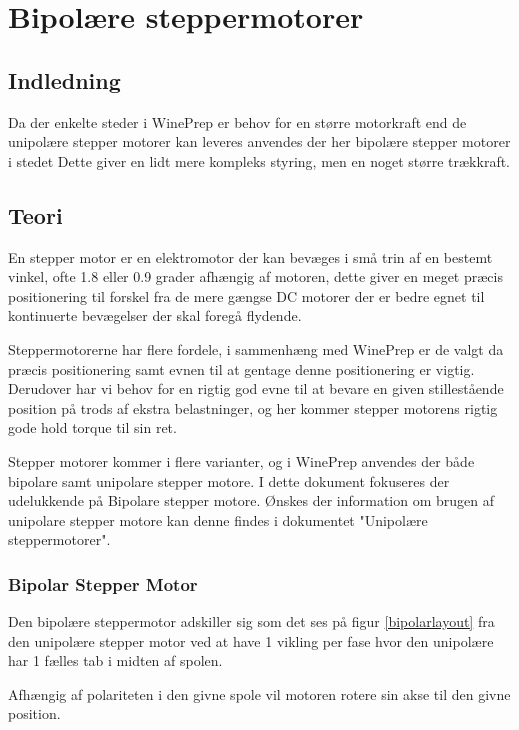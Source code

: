 \chapter{Bipolære steppermotorer}

\section{Indledning}
Da der enkelte steder i WinePrep er behov for en større motorkraft end de unipolære stepper motorer kan leveres anvendes der her bipolære stepper motorer
i stedet Dette giver en lidt mere kompleks styring, men en noget større trækkraft.

\section{Teori}
En stepper motor er en elektromotor der kan bevæges i små trin af en bestemt vinkel, ofte 1.8 eller 0.9 grader afhængig af motoren, dette giver en meget
præcis positionering til forskel fra de mere gængse DC motorer der er bedre egnet til kontinuerte bevægelser der skal foregå flydende.

Steppermotorerne har flere fordele, i sammenhæng med WinePrep er de valgt da præcis positionering samt evnen til at gentage denne positionering er vigtig.
Derudover har vi behov for en rigtig god evne til at bevare en given stillestående position på trods af ekstra belastninger, og her kommer stepper motorens
rigtig gode hold torque til sin ret.

Stepper motorer kommer i flere varianter, og i WinePrep anvendes der både bipolare samt unipolare stepper motore. I dette dokument fokuseres der udelukkende
på Bipolare stepper motore. Ønskes der information om brugen af unipolare stepper motore kan denne findes i dokumentet "Unipolære steppermotorer".

\subsection{Bipolar Stepper Motor}

Den bipolære steppermotor adskiller sig som det ses på figur \ref{bipolarlayout} fra den unipolære stepper motor ved at have 1 vikling per fase hvor den
unipolære har 1 fælles tab i midten af spolen.

Afhængig af polariteten i den givne spole vil motoren rotere sin akse til den givne position.

